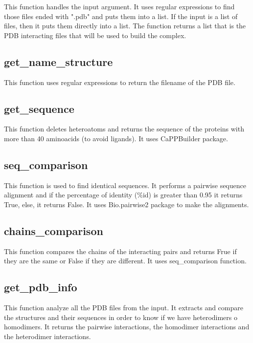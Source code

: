 \documentclass[a4paper,12pt]{report}
\begin{document}
This function handles the input argument. It uses regular expressions to find those files ended with ".pdb" and puts them into a list. If the input is a list of files, then it puts them directly into a list. The function returns a list that is the PDB interacting files that will be used to build the complex.

\subsection{get\_name\_structure}

This function uses regular expressions to return the filename of the PDB file.

\subsection{get\_sequence}

This function deletes heteroatoms and returns the sequence of the proteins with more than 40 aminoacids (to avoid ligands). It uses CaPPBuilder package.

\subsection{seq\_comparison}

This function is used to find identical sequences. It performs a pairwise sequence alignment and if the percentage of identity (\%id) is greater than 0.95 it returns True, else, it returns False. It uses Bio.pairwise2 package to make the alignments.

\subsection{chains\_comparison}

This function compares the chains of the interacting pairs and returns Frue if they are the same or False if they are different. It uses seq\_comparison function.

\subsection{get\_pdb\_info}

This function analyze all the PDB files from the input. It extracts and compare the structures and their sequences in order to know if we have heterodimers o homodimers. It returns the pairwise interactions, the homodimer interactions and the heterodimer interactions.
\end{document}
